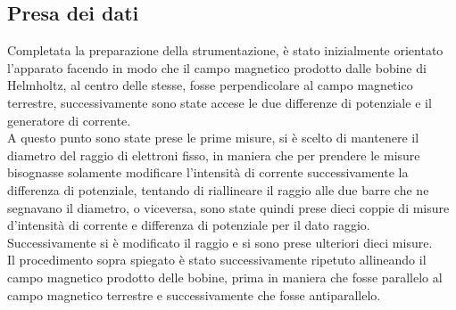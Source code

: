 \subsection{Presa dei dati}
    Completata la preparazione della strumentazione, 
    è stato inizialmente orientato l'apparato facendo in modo che il campo magnetico prodotto dalle bobine di Helmholtz, al centro delle stesse, fosse perpendicolare 
    al campo magnetico terrestre, successivamente sono state accese le due differenze di potenziale e il generatore di corrente.\\
    A questo punto sono state prese le prime misure, si è scelto di mantenere il diametro del raggio di elettroni fisso, in maniera che per prendere le misure bisognasse 
    solamente modificare l'intensità di corrente successivamente la differenza di potenziale, tentando di riallineare il raggio alle due barre che ne segnavano il diametro, 
    o viceversa, sono state quindi prese dieci coppie di misure d'intensità di corrente e differenza di potenziale per il dato raggio.\\
    Successivamente si è modificato il raggio e si sono prese ulteriori dieci misure.\\
    Il procedimento sopra spiegato è stato successivamente ripetuto allineando il campo magnetico prodotto delle bobine, prima in maniera che fosse parallelo al campo 
    magnetico terrestre e successivamente che fosse antiparallelo.